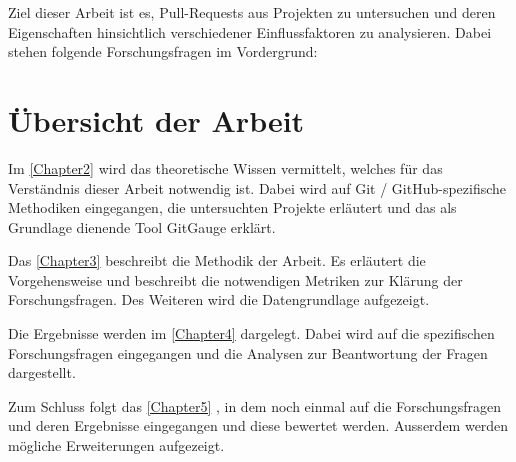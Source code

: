 Ziel dieser Arbeit ist es, Pull-Requests aus Projekten zu untersuchen und deren Eigenschaften hinsichtlich verschiedener Einflussfaktoren zu analysieren. Dabei stehen folgende Forschungsfragen im Vordergrund:








\section{Übersicht der Arbeit}
Im \autoref{Chapter2}  wird das theoretische Wissen vermittelt, welches für das Verständnis dieser Arbeit notwendig ist. Dabei wird auf  Git / GitHub-spezifische Methodiken eingegangen, die untersuchten Projekte erläutert und das als Grundlage dienende Tool GitGauge erklärt.

Das \autoref{Chapter3}  beschreibt die Methodik der Arbeit. Es erläutert die Vorgehensweise und beschreibt die notwendigen Metriken zur Klärung der Forschungsfragen. Des Weiteren wird die Datengrundlage aufgezeigt.


Die Ergebnisse werden im \autoref{Chapter4}  dargelegt. Dabei wird auf die spezifischen Forschungsfragen eingegangen und die Analysen zur Beantwortung der Fragen dargestellt. 

Zum Schluss folgt das \autoref{Chapter5} , in dem noch einmal auf die Forschungsfragen und deren Ergebnisse eingegangen und diese bewertet werden. Ausserdem werden mögliche Erweiterungen aufgezeigt.





